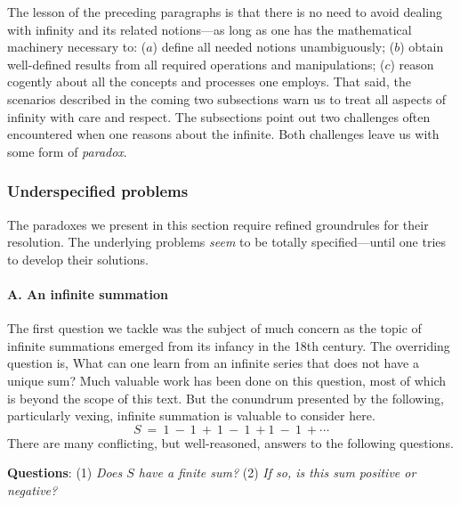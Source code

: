 \smallskip

The lesson of the preceding paragraphs is that there is no need to avoid dealing with infinity and its related notions---as long as one has the mathematical machinery necessary to: ($a$) define all needed notions unambiguously; ($b$) obtain well-defined results from all required operations and manipulations; ($c$) reason cogently about all the concepts and processes one employs.  That said, the scenarios described in the coming two subsections warn us to treat all aspects of infinity with care and respect.  The subsections point out two challenges often encountered when one reasons about the infinite.  Both challenges leave us with some form of {\em paradox}.

\subsubsection{Underspecified problems}
\label{sec:underspecified}

The paradoxes we present in this section require refined groundrules for their resolution.  The underlying problems {\em seem} to be totally specified---until one tries to develop their solutions.

\paragraph{A. An infinite summation}

The first question we tackle was the subject of much concern as the topic of infinite summations emerged from its infancy in the 18th century.  The overriding question is, What can one learn from an infinite series that does not have a unique sum?  Much valuable work has been done on this question, most of which is beyond the scope of this text.  But the conundrum presented by the following, particularly vexing, infinite summation is valuable to consider here.
\[ S \ = \ 1 \ - \ 1 \ + \ 1 \ - \ 1 \ + 1 \ - \ 1 \ + \cdots \]
There are many conflicting, but well-reasoned, answers to the following questions.

\medskip

\noindent
{\bf Questions}:  (1) {\it Does $S$ have a finite sum?}  (2) {\it If so, is this sum positive or negative?}

\smallskip

